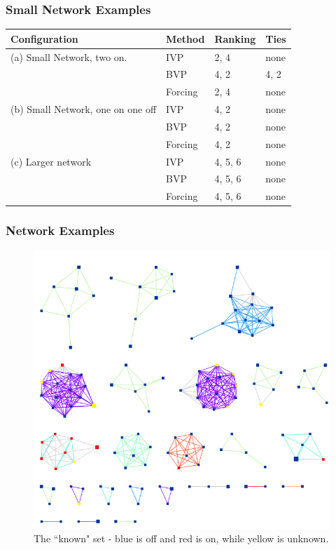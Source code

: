 \documentclass{beamer}
\begin{document}
\begin{frame}
\frametitle{Small Network Examples}
	\begin{center}
		\begin{tabular}{|l|l|l|l|}
			\hline Configuration & Method & Ranking & Ties\\
			\hline
			(a) Small Network, two on. &  IVP & 2, 4 & none  \\ \cline{2-4}
			& BVP & 4, 2 & 4, 2 \\ \cline{2-4}
			& Forcing & 2, 4 & none \\
			\hline
			(b) Small Network, one on one off &  IVP & 4, 2 &none \\ \cline{2-4}
			& BVP &4, 2 & none  \\ \cline{2-4}
			& Forcing &4, 2 & none\\
			\hline
			(c) Larger network &  IVP & 4, 5, 6& none \\ \cline{2-4}
			& BVP & 4, 5, 6&  none\\ \cline{2-4}
			& Forcing &  4, 5, 6& none \\
			\hline
		\end{tabular}
	\end{center}
\end{frame}
\begin{frame}
\frametitle{Network Examples}
\begin{figure}
		\begin{center}
	\includegraphics[scale = 0.25]{ranked_known_nodes.png}	
\end{center}
\caption{The ``known" set - blue is off and red is on, while yellow is unknown.}
\end{figure}
\end{frame}
\end{document}
